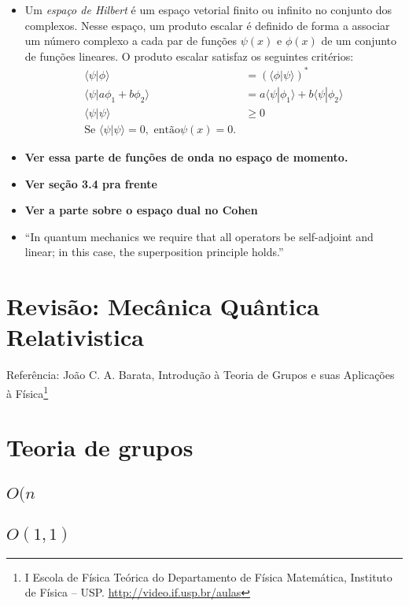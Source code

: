 \begin{itemize}
	\item Um \emph{espaço de Hilbert} é um espaço vetorial finito ou infinito no conjunto dos complexos. Nesse espaço, um produto escalar é definido de forma a associar um número complexo a cada par de funções $\psi(x)$ e $\phi(x)$ de um conjunto de funções lineares. O produto escalar satisfaz os seguintes critérios:
\begin{align}
	\langle\psi|\phi\rangle &= (\langle \phi|\psi\rangle)^* \\
	\langle\psi|a\phi_1 + b\phi_2\rangle &= a\langle\psi|\phi_1\rangle + b\langle\psi|\phi_2\rangle \\
	\langle\psi|\psi\rangle &\geq 0 \\
	\textrm{Se~}\langle\psi|\psi\rangle = 0,\textrm{~então} \psi(x) = 0.
\end{align}
	\item \textbf{Ver essa parte de funções de onda no espaço de momento.}
	\item \textbf{Ver seção 3.4 pra frente}
	\item \textbf{Ver a parte sobre o espaço dual no Cohen}
	\item ``In quantum mechanics we require that all operators be self-adjoint and linear; in this case, the superposition principle holds.''
\end{itemize}

\section{Revisão: Mecânica Quântica Relativistica}

Referência: João C. A. Barata, Introdução à Teoria de Grupos e suas Aplicações à Física\footnote{I Escola de Física Teórica do Departamento de Física Matemática, Instituto de Física -- USP. \url{http://video.if.usp.br/aulas}}

\section{Teoria de grupos}

\subsection{$O(n$}

\subsection{$O(1,1)$}

